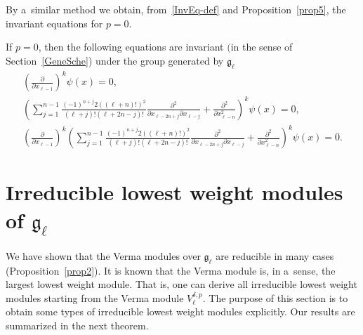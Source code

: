 \documentclass[pdftex]{sigma}
\numberwithin{equation}{section}
\begin{document}
By a~similar method we obtain, from~\eqref{InvEq-def} and Proposition~\ref{prop5}, the invariant equations for $ p = 0$.
\begin{proposition}
\label{prop7}
If $ p = 0 $, then the following equations are invariant $($in the sense of Section~{\rm \ref{GeneSche})} under the group generated
by ${\mathfrak g}_{\ell}$
\begin{gather*}
    \left(\frac{\partial}{\partial x_{\ell-1}} \right)^k \psi(x) = 0,
\\
    \left(\sum\limits_{j=1}^{n-1} \frac{(-1)^{n+j} 2 ((\ell+n)!)^2}{(\ell+j)! (\ell+2n-j)!} \frac{\partial^2}{\partial
x_{\ell-2n+j} \partial x_{\ell-j}} + \frac{\partial^2}{\partial x_{\ell-n}^2} \right)^k \psi(x) = 0,
\\
    \left(\frac{\partial}{\partial x_{\ell-1}} \right)^k \left(\sum\limits_{j=1}^{n-1} \frac{(-1)^{n+j} 2
((\ell+n)!)^2}{(\ell+j)! (\ell+2n-j)!} \frac{\partial^2}{\partial x_{\ell-2n+j} \partial x_{\ell-j}} +
\frac{\partial^2}{\partial x_{\ell-n}^2} \right)^k \psi(x) = 0.
\end{gather*}
\end{proposition}

\section[Irreducible lowest weight modules of ${\mathfrak g}_{\ell}$]{Irreducible lowest weight modules of $\boldsymbol{{\mathfrak g}_{\ell}}$}
\label{SEC:IRREP}

We have shown that the Verma modules over $ {\mathfrak g}_{\ell} $ are reducible in many cases
(Proposition~\ref{prop2}).
It is known that the Verma module is, in a~sense, the largest lowest weight module.
That is, one can derive all irreducible lowest weight modules starting from the Verma module $ V^{\delta,p}_{\ell}$.
The purpose of this section is to obtain some types of irreducible lowest weight modules explicitly.
Our results are summarized in the next theorem.
\end{document}
